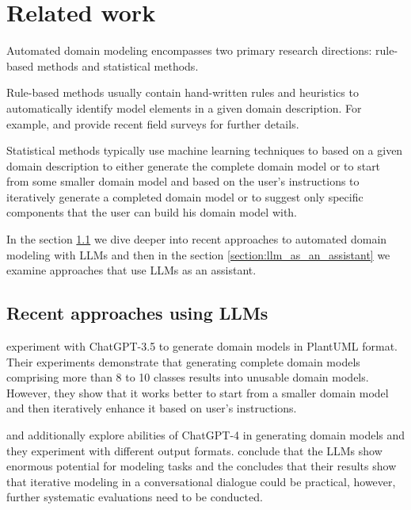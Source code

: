 \chapter{Related work}

Automated domain modeling encompasses two primary research directions: rule-based methods and statistical methods.

Rule-based methods usually contain hand-written rules and heuristics to automatically identify model elements in a given domain description. For example, \citet{Raharjana2021} and \citet{Sonbol2022} provide recent field surveys for further details.

Statistical methods typically use machine learning techniques to based on a given domain description to either generate the complete domain model \cite{Chen2023,Saeedizade2024} or to start from some smaller domain model and based on the user's instructions to iteratively generate a completed domain model \cite{Camara2023} or to suggest only specific components that the user can build his domain model with.

In the section \ref{section:ref_recent_approaches_using_llms} we dive deeper into recent approaches to automated domain modeling with LLMs and then in the section \ref{section:llm_as_an_assistant} we examine approaches that use LLMs as an assistant.


\section{Recent approaches using LLMs}
\label{section:ref_recent_approaches_using_llms}

\citet{Camara2023} experiment with ChatGPT-3.5 to generate domain models in PlantUML format. Their experiments demonstrate that generating complete domain models comprising more than 8 to 10 classes results into unusable domain models. However, they show that it works better to start from a smaller domain model and then iteratively enhance it based on user's instructions.

\citet{Fill2023} and \citet{Haerer2023} additionally explore abilities of ChatGPT-4 in generating domain models and they experiment with different output formats. \citet{Fill2023} conclude that the LLMs show enormous potential for modeling tasks and the \citet{Haerer2023} concludes that their results show that iterative modeling in a conversational dialogue could be practical, however, further systematic evaluations need to be conducted.

